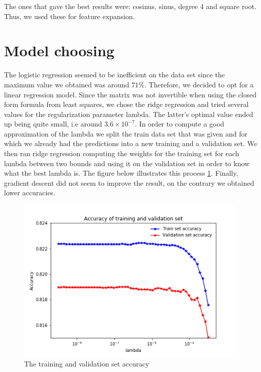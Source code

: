 \documentclass[10pt,conference,compsocconf]{IEEEtran}
\begin{document}
The ones that gave the best results were: cosinus, sinus, degree 4 and square root. Thus, we used these for feature expansion.

\section{Model choosing}
The logistic regression seemed to be inefficient on the data set since the maximum value we obtained was around $71\%$. Therefore, we decided to opt for a linear regression model. Since the matrix was not invertible when using the closed form formula from least squares, we chose the ridge regression and tried several values for the regularization parameter lambda. The latter's optimal value ended up being quite small, i.e around $3.6 \times 10^{-7}$. In order to compute a good approximation of the lambda we split the train data set that was given and for which we already had the predictions into a new training and a validation set. We then ran ridge regression computing the weights for the training set for each lambda between two bounds and using it on the validation set in order to know what the best lambda is. The figure below illustrates this process \ref{fig:training-and-validation-set-accuracy}. Finally, gradient descent did not seem to improve the result, on the contrary we obtained lower accuracies.

\begin{figure}[h!]
	\centering
  \includegraphics[width=\columnwidth]{validation.png}
  \caption{The training and validation set accuracy}
	\label{fig:training-and-validation-set-accuracy}
\end{figure}
\end{document}
